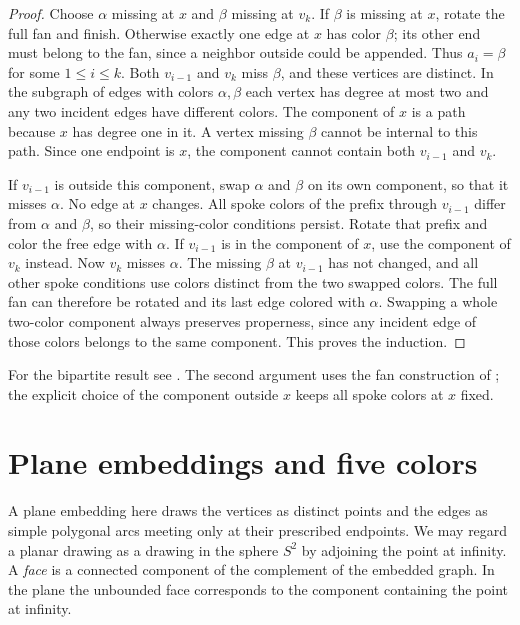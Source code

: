 \documentclass[11pt,oneside,openany]{book}
\theoremstyle{plain}
\theoremstyle{definition}
\theoremstyle{remark}
\begin{document}
\begin{proof}
Choose \(\alpha\) missing at \(x\) and \(\beta\) missing at \(v_k\).
If \(\beta\) is missing at \(x\), rotate the full fan and finish.
Otherwise exactly one edge at \(x\) has color \(\beta\); its
other end must belong to the fan, since a neighbor outside
could be appended. Thus \(a_i=\beta\) for some \(1\le i\le k\).
Both \(v_{i-1}\) and \(v_k\) miss \(\beta\), and these vertices
are distinct. In the subgraph of edges with colors
\(\alpha,\beta\) each vertex has degree at most two and any
two incident edges have different colors. The component
of \(x\) is a path because \(x\) has degree one in it.
A vertex missing \(\beta\) cannot be internal to this path.
Since one endpoint is \(x\), the component cannot contain
both \(v_{i-1}\) and \(v_k\).

If \(v_{i-1}\) is outside this component, swap \(\alpha\) and
\(\beta\) on its own component, so that it misses \(\alpha\).
No edge at \(x\) changes. All spoke colors of the prefix through
\(v_{i-1}\) differ from \(\alpha\) and \(\beta\), so their
missing-color conditions persist. Rotate that prefix and color
the free edge with \(\alpha\).
If \(v_{i-1}\) is in the component of \(x\), use the component
of \(v_k\) instead. Now \(v_k\) misses \(\alpha\). The missing
\(\beta\) at \(v_{i-1}\) has not changed, and all other spoke
conditions use colors distinct from the two swapped colors.
The full fan can therefore be rotated and its last edge
colored with \(\alpha\). Swapping a whole two-color component
always preserves properness, since any incident edge of those
colors belongs to the same component. This proves the induction.
\end{proof}

For the bipartite result see \cite[Chapter 20]{Schrijver}.
The second argument uses the fan construction of \cite{MG};
the explicit choice of the component outside \(x\) keeps all
spoke colors at \(x\) fixed.

\section{Plane embeddings and five colors}

A plane embedding here draws the vertices as distinct points and
the edges as simple polygonal arcs meeting only at their prescribed
endpoints. We may regard a planar drawing as a drawing in the
sphere \(S^2\) by adjoining the point at infinity. A \emph{face}
is a connected component of the complement of the embedded graph.
In the plane the unbounded face corresponds to the component
containing the point at infinity.
\end{document}
